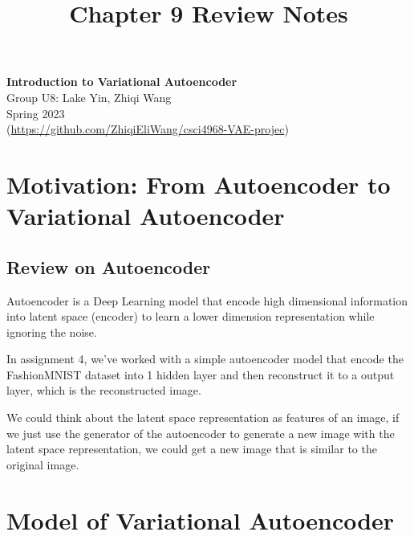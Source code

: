 \documentclass[11pt]{article}
\theoremstyle{definition}
\begin{document}
\setcounter{section}{0}
\title{Chapter 9 Review Notes}

\thispagestyle{empty}

\begin{center}
{\LARGE \bf Introduction to Variational Autoencoder}\\
{\large Group U8: Lake Yin, Zhiqi Wang}\\
Spring 2023\\
(\href{https://github.com/ZhiqiEliWang/csci4968-VAE-project}{https://github.com/ZhiqiEliWang/csci4968-VAE-projec})
\end{center}
\section{Motivation: From Autoencoder to Variational Autoencoder}
\subsection{Review on Autoencoder}
Autoencoder is a Deep Learning model that encode high dimensional information into latent space (encoder) to learn a lower dimension representation while ignoring the noise. 

In assignment 4, we've worked with a simple autoencoder model that encode the FashionMNIST dataset into 1 hidden layer and then reconstruct it to a output layer, which is the reconstructed image.

We could think about the latent space representation as features of an image, if we just use the generator of the autoencoder to generate a new image with the latent space representation, we could get a new image that is similar to the original image.

\section{Model of Variational Autoencoder}
\end{document}
